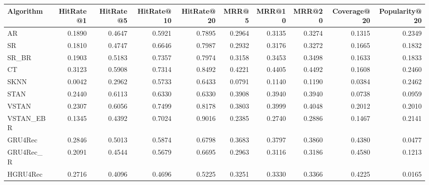 \begin{tabular}{lrrrrrrrrr}
\toprule
 Algorithm &  HitRate@1 &  HitRate@5 &  HitRate@10 &  HitRate@20 &   MRR@5 &  MRR@10 &  MRR@20 &  Coverage@20 &  Popularity@20 \\
\midrule
        AR &     0.1890 &     0.4647 &      0.5921 &      0.7895 &  0.2964 &  0.3135 &  0.3274 &       0.1315 &         0.2349 \\
        SR &     0.1810 &     0.4747 &      0.6646 &      0.7987 &  0.2932 &  0.3176 &  0.3272 &       0.1665 &         0.1832 \\
     SR\_BR &     0.1903 &     0.5183 &      0.7357 &      0.7974 &  0.3158 &  0.3453 &  0.3498 &       0.1633 &         0.1833 \\
        CT &     0.3123 &     0.5908 &      0.7314 &      0.8492 &  0.4221 &  0.4405 &  0.4492 &       0.1608 &         0.2460 \\
      SKNN &     0.0042 &     0.2962 &      0.5733 &      0.6433 &  0.0791 &  0.1140 &  0.1190 &       0.0384 &         0.2462 \\
      STAN &     0.2440 &     0.6113 &      0.6330 &      0.6330 &  0.3908 &  0.3940 &  0.3940 &       0.0738 &         0.0959 \\
     VSTAN &     0.2307 &     0.6056 &      0.7499 &      0.8178 &  0.3803 &  0.3999 &  0.4048 &       0.2012 &         0.2010 \\
 VSTAN\_EBR &     0.1345 &     0.4392 &      0.7024 &      0.9016 &  0.2385 &  0.2740 &  0.2886 &       0.1467 &         0.2141 \\
   GRU4Rec &     0.2846 &     0.5013 &      0.5874 &      0.6798 &  0.3683 &  0.3797 &  0.3860 &       0.4380 &         0.0477 \\
 GRU4Rec\_R &     0.2091 &     0.4544 &      0.5679 &      0.6695 &  0.2963 &  0.3116 &  0.3186 &       0.4580 &         0.1213 \\
  HGRU4Rec &     0.2716 &     0.4096 &      0.4696 &      0.5225 &  0.3251 &  0.3330 &  0.3366 &       0.4225 &         0.0165 \\
\bottomrule
\end{tabular}
